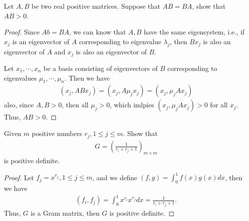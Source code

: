 \documentclass[12pt,leqno]{amsart}
\begin{document}
\medskip

 Let $A,B$ be two real positive matrices. Suppose that $AB = BA$, show that $AB > 0$. 
\begin{proof}
Since $Ab = BA$, we can know that $A,B$ have the same eigensystem, i.e., if $x_j$ is an eigenvector of $A$ corresponding to eigenvalue $\lambda_j$, then $Bx_j$ is also an eigenvector of $A$ and $x_j$ is also an eigenvector of $B$. 

Let $x_1, \cdots, x_n$ be a basis consisting of eigenvectors of $B$ corresponding to eigenvalues $\mu_1,\cdots,\mu_n$. Then we have
\begin{align*}
    \left(x_j, ABx_j\right) = \left(x_j, A\mu_j x_j\right) = \left(x_j, \mu_j Ax_j\right)
\end{align*}
also, since $A,B > 0$, then all $\mu_j > 0$, which imlpies $\left(x_j, \mu_j Ax_j\right) > 0$ for all $x_j$. Thus, $AB > 0$.
\end{proof}

\medskip

 Given $m$ positive numbers $r_j, 1\leq j \leq m$. Show that 
\begin{align*}
    G = \left(\frac{1}{r_i + r_j + 1}\right)_{m\times m}
\end{align*}
is positive definite.
\begin{proof}
Let $f_j = x^{r_j}, 1\leq j \leq m$, and we define $(f,g) = \int^1_0 f(x)g(x)dx$, then we have 
\begin{align*}
    (f_i, f_j) = \int^1_0 x^{r_i}x^{r_j}dx = \frac{1}{r_i + r_j + 1}.
\end{align*}
Thus, $G$ is a Gram matrix, then $G$ is positive definite.
\end{proof}
\end{document}
